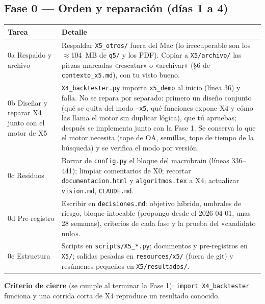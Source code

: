 \documentclass[11pt,a4paper]{article}
\newcommand{\code}[1]{\texttt{\small #1}}
\begin{document}
\subsection{Fase 0 — Orden y reparación (días 1 a 4)}\label{sec:f0}
\begin{table}[H]
\centering\small
\begin{tabularx}{\linewidth}{lX}
\toprule
Tarea & Detalle \\
\midrule
0a Respaldo y archivo & Respaldar \code{X5\_otros/} fuera del Mac (lo irrecuperable son los \(\approx\)104~MB de \code{q5/} y los PDF). Copiar a \code{X5/archivo/} las piezas marcadas «rescatar» o «archivar» (§6 de \code{contexto\_x5.md}), con tu visto bueno. \\
0b Diseñar y reparar X4 junto con el motor de X5 & \code{X4\_backtester.py} importa \code{x5\_demo} al inicio (línea 36) y falla. No se repara por separado: primero un diseño conjunto (qué se quita del modo \code{--x5}, qué funciones expone X4 y cómo las llama el motor sin duplicar lógica), que tú apruebas; después se implementa junto con la Fase 1. Se conserva lo que el motor necesita (tope de OA, semillas, tope de tiempo de la búsqueda) y se verifica el modo por versión. \\
0c Residuos & Borrar de \code{config.py} el bloque del macrobrain (líneas 336--441); limpiar comentarios de X0; recortar \code{documentacion.html} y \code{algoritmos.tex} a X4; actualizar \code{vision.md}, \code{CLAUDE.md}. \\
0d Pre-registro & Escribir en \code{decisiones.md}: objetivo híbrido, umbrales de riesgo, bloque intocable (propongo desde el 2026-04-01, unas 28 semanas), criterios de cada fase y la prueba del «candidato nulo». \\
0e Estructura & Scripts en \code{scripts/X5\_*.py}; documentos y pre-registros en \code{X5/}; salidas pesadas en \code{resources/x5/} (fuera de git) y resúmenes pequeños en \code{X5/resultados/}. \\
\bottomrule
\end{tabularx}
\end{table}
\textbf{Criterio de cierre} (se cumple al terminar la Fase 1): \code{import X4\_backtester} funciona y una corrida corta de X4 reproduce un resultado conocido.
\end{document}
